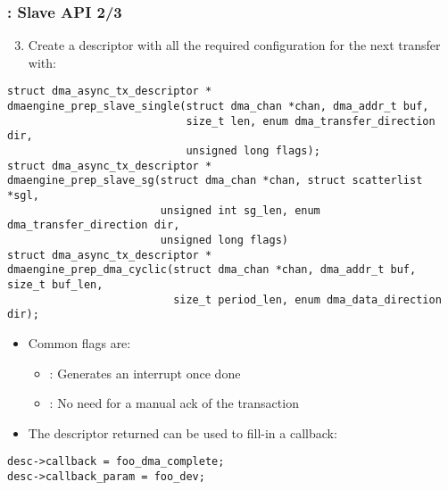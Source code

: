 \begin{frame}[fragile]
  \frametitle{: Slave API 2/3}
  \begin{enumerate}
    \setcounter{enumi}{2}
  \item Create a descriptor with all the required configuration for the
    next transfer with:
  \end{enumerate}
\begin{verbatim}
struct dma_async_tx_descriptor *
dmaengine_prep_slave_single(struct dma_chan *chan, dma_addr_t buf,
                            size_t len, enum dma_transfer_direction dir,
                            unsigned long flags);
struct dma_async_tx_descriptor *
dmaengine_prep_slave_sg(struct dma_chan *chan, struct scatterlist *sgl,
                        unsigned int sg_len, enum dma_transfer_direction dir,
                        unsigned long flags)
struct dma_async_tx_descriptor *
dmaengine_prep_dma_cyclic(struct dma_chan *chan, dma_addr_t buf, size_t buf_len,
                          size_t period_len, enum dma_data_direction dir);
\end{verbatim}
  \begin{itemize}
  \item Common flags are:
    \begin{itemize}
    \item {}: Generates an interrupt once done
    \item {}: No need for a manual ack of the
      transaction
    \end{itemize}
  \item The descriptor returned can be used to fill-in a callback:
  \end{itemize}
\begin{verbatim}
desc->callback = foo_dma_complete;
desc->callback_param = foo_dev;
\end{verbatim}
\end{frame}


